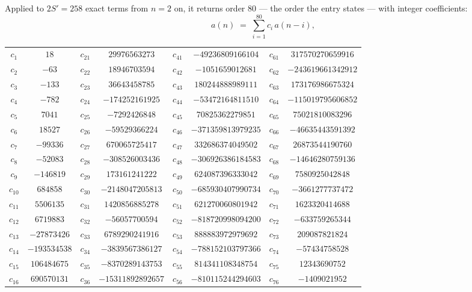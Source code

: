 \documentclass[11pt,a4paper]{article}
\theoremstyle{plain}
\theoremstyle{definition}
\begin{document}
Applied to $2S'=258$ exact terms from $n=2$ on, it returns order $80$ --- the
order the entry states --- with integer coefficients:
\[
a(n)\;=\;\sum_{i=1}^{80}c_i\,a(n-i),
\]
\begin{center}\small
\begin{tabular}{cccccccc}
$c_{1}$ & $18$ & $c_{21}$ & $29976563273$ & $c_{41}$ & $-49236809166104$ & $c_{61}$ & $317570270659916$ \\
$c_{2}$ & $-63$ & $c_{22}$ & $18946703594$ & $c_{42}$ & $-1051659012681$ & $c_{62}$ & $-243619661342912$ \\
$c_{3}$ & $-133$ & $c_{23}$ & $36643458785$ & $c_{43}$ & $180244888989111$ & $c_{63}$ & $173176986675324$ \\
$c_{4}$ & $-782$ & $c_{24}$ & $-174252161925$ & $c_{44}$ & $-53472164811510$ & $c_{64}$ & $-115019795606852$ \\
$c_{5}$ & $7041$ & $c_{25}$ & $-7292426848$ & $c_{45}$ & $70825362279851$ & $c_{65}$ & $75021810083296$ \\
$c_{6}$ & $18527$ & $c_{26}$ & $-59529366224$ & $c_{46}$ & $-371359813979235$ & $c_{66}$ & $-46635443591392$ \\
$c_{7}$ & $-99336$ & $c_{27}$ & $670065725417$ & $c_{47}$ & $332686374049502$ & $c_{67}$ & $26873544190760$ \\
$c_{8}$ & $-52083$ & $c_{28}$ & $-308526003436$ & $c_{48}$ & $-306926386184583$ & $c_{68}$ & $-14646280759136$ \\
$c_{9}$ & $-146819$ & $c_{29}$ & $173161241222$ & $c_{49}$ & $624087396333042$ & $c_{69}$ & $7580925042848$ \\
$c_{10}$ & $684858$ & $c_{30}$ & $-2148047205813$ & $c_{50}$ & $-685930407990734$ & $c_{70}$ & $-3661277737472$ \\
$c_{11}$ & $5506135$ & $c_{31}$ & $1420856885278$ & $c_{51}$ & $621270060801942$ & $c_{71}$ & $1623320414688$ \\
$c_{12}$ & $6719883$ & $c_{32}$ & $-56057700594$ & $c_{52}$ & $-818720998094200$ & $c_{72}$ & $-633759265344$ \\
$c_{13}$ & $-27873426$ & $c_{33}$ & $6789290241916$ & $c_{53}$ & $888883972979692$ & $c_{73}$ & $209087821824$ \\
$c_{14}$ & $-193534538$ & $c_{34}$ & $-3839567386127$ & $c_{54}$ & $-788152103797366$ & $c_{74}$ & $-57434758528$ \\
$c_{15}$ & $106484675$ & $c_{35}$ & $-8370289143753$ & $c_{55}$ & $814341108348754$ & $c_{75}$ & $12343690752$ \\
$c_{16}$ & $690570131$ & $c_{36}$ & $-15311892892657$ & $c_{56}$ & $-810115244294603$ & $c_{76}$ & $-1409021952$ \\

\end{tabular}
\end{center}
\end{document}

